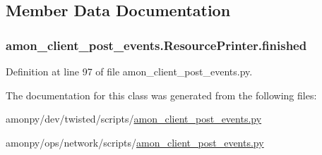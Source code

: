 \subsection{Member Data Documentation}
\hypertarget{classamon__client__post__events_1_1_resource_printer_a3ce60f948a4daf648804159b510a78f8}{
\subsubsection[{finished}]{\setlength{\rightskip}{0pt plus 5cm}amon\-\_\-client\-\_\-post\-\_\-events.\-Resource\-Printer.\-finished}}\label{classamon__client__post__events_1_1_resource_printer_a3ce60f948a4daf648804159b510a78f8}


Definition at line 97 of file amon\-\_\-client\-\_\-post\-\_\-events.\-py.



The documentation for this class was generated from the following files\-:\begin{DoxyCompactItemize}
\item 
amonpy/dev/twisted/scripts/\hyperlink{dev_2twisted_2scripts_2amon__client__post__events_8py}{amon\-\_\-client\-\_\-post\-\_\-events.\-py}\item 
amonpy/ops/network/scripts/\hyperlink{ops_2network_2scripts_2amon__client__post__events_8py}{amon\-\_\-client\-\_\-post\-\_\-events.\-py}\end{DoxyCompactItemize}
